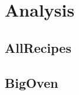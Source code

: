 \documentclass{article}
\begin{document}
\clearpage

\section*{Analysis}

\subsection*{AllRecipes}

\subsection*{BigOven}
\end{document}
